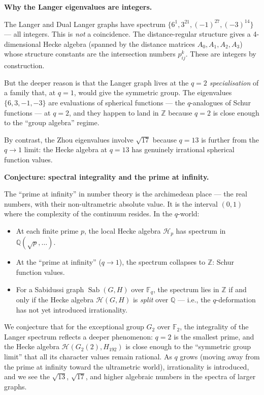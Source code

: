 \documentclass[11pt,a4paper]{article}
\theoremstyle{plain}
\theoremstyle{definition}
\newcommand{\Sab}{\operatorname{Sab}}
\begin{document}
\begin{tcolorbox}[breakable, colback=yellow!12, colframe=yellow!12,
  boxrule=0pt, sharp corners]
\textbf{Why the Langer eigenvalues are integers.}

The Langer and Dual Langer graphs have spectrum $\{6^1, 3^{21}, (-1)^{27}, (-3)^{14}\}$
--- all integers. This is \emph{not} a coincidence. The distance-regular
structure gives a 4-dimensional Hecke algebra (spanned by the distance
matrices $A_0, A_1, A_2, A_3$) whose structure constants are the
intersection numbers $p^k_{ij}$. These are integers by construction.

But the deeper reason is that the Langer graph lives at the
\emph{$q = 2$ specialisation} of a family that, at $q = 1$, would give
the symmetric group. The eigenvalues $\{6, 3, -1, -3\}$ are evaluations
of spherical functions --- the $q$-analogues of Schur functions ---
at $q = 2$, and they happen to land in $\mathbb{Z}$ because $q = 2$
is close enough to the ``group algebra'' regime.

By contrast, the Zhou eigenvalues involve $\sqrt{17}$ because $q = 13$
is further from the $q \to 1$ limit: the Hecke algebra at $q = 13$
has genuinely irrational spherical function values.
\end{tcolorbox}

\begin{tcolorbox}[breakable, colback=blue!8, colframe=blue!8,
  boxrule=0pt, sharp corners]
\textbf{Conjecture: spectral integrality and the prime at infinity.}

The ``prime at infinity'' in number theory is the archimedean place ---
the real numbers, with their non-ultrametric absolute value. It is the
interval $(0,1)$ where the complexity of the continuum resides. In the
$q$-world:
\begin{itemize}
\item At each finite prime $p$, the local Hecke algebra $\mathcal{H}_p$
  has spectrum in $\mathbb{Q}(\sqrt{p}, \ldots)$.
\item At the ``prime at infinity'' ($q \to 1$), the spectrum collapses
  to $\mathbb{Z}$: Schur function values.
\item For a Sabidussi graph $\Sab(G, H)$ over $\mathbb{F}_q$, the
  spectrum lies in $\mathbb{Z}$ if and only if the Hecke algebra
  $\mathcal{H}(G, H)$ is \emph{split} over $\mathbb{Q}$ --- i.e.,
  the $q$-deformation has not yet introduced irrationality.
\end{itemize}

We conjecture that for the exceptional group $G_2$ over $\mathbb{F}_2$,
the integrality of the Langer spectrum reflects a deeper phenomenon:
$q = 2$ is the smallest prime, and the Hecke algebra $\mathcal{H}(G_2(2), H_{192})$
is close enough to the ``symmetric group limit'' that all its character
values remain rational. As $q$ grows (moving away from the prime at
infinity toward the ultrametric world), irrationality is introduced,
and we see the $\sqrt{13}$, $\sqrt{17}$, and higher algebraic numbers
in the spectra of larger graphs.
\end{tcolorbox}
\end{document}
